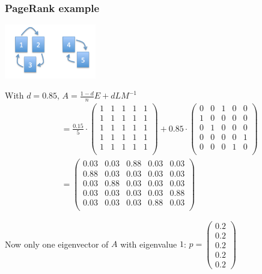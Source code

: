 \documentclass[mathserif]{beamer}
\def\red{\color[rgb]{0.8,0,0}}
\begin{document}
\begin{frame}
\frametitle{PageRank example}
\vspace{-5pt}
\parbox{0.3\textwidth}{
\includegraphics[width=0.3\textwidth]{disconnected-big.png}}
\hspace{5pt}
With $d=0.85$, $A = \frac{1-d}{n}E + dLM^{-1}$
\vspace{-5pt}
\begin{align*}
&=
\frac{0.15}{5} \cdot
\left(\begin{array}{ccccc}
1 & 1 & 1 & 1 & 1 \\
1 & 1 & 1 & 1 & 1 \\
1 & 1 & 1 & 1 & 1 \\
1 & 1 & 1 & 1 & 1 \\
1 & 1 & 1 & 1 & 1 \\
\end{array}\right) + 
0.85 \cdot 
\left(\begin{array}{ccccc}
0 & 0 & 1 & 0 & 0 \\
1 & 0 & 0 & 0 & 0 \\
0 & 1 & 0 & 0 & 0 \\
0 & 0 & 0 & 0 & 1 \\
0 & 0 & 0 & 1 & 0 \\
\end{array}\right) \\
& = 
\left(\begin{array}{ccccc}
0.03 & 0.03 & 0.88 & 0.03 & 0.03 \\
0.88 & 0.03 & 0.03 & 0.03 & 0.03 \\
0.03 & 0.88 & 0.03 & 0.03 & 0.03 \\
0.03 & 0.03 & 0.03 & 0.03 & 0.88 \\
0.03 & 0.03 & 0.03 & 0.88 & 0.03 \\
\end{array}\right)
\end{align*}

\vspace{-25pt}
Now {\red only one} eigenvector of $A$ 
with eigenvalue $1$:
$p=
\left(\begin{array}{c} 0.2 \\ 0.2 \\ 0.2 \\ 0.2 \\ 0.2
\end{array}\right)$
\end{frame}
\end{document}
